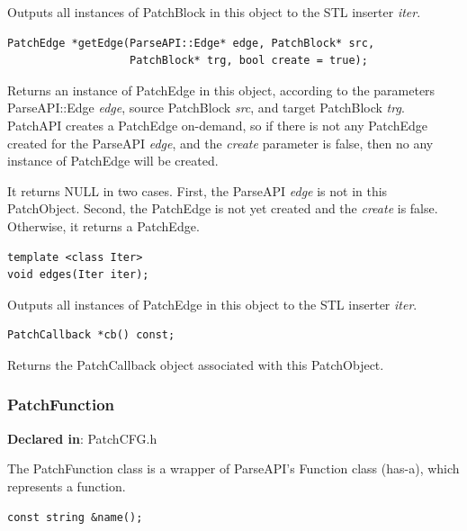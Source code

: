 \documentclass[11pt]{article}
\begin{document}
Outputs all instances of PatchBlock in this object to the STL inserter \emph{iter}.


\begin{verbatim}
PatchEdge *getEdge(ParseAPI::Edge* edge, PatchBlock* src,
                   PatchBlock* trg, bool create = true);

\end{verbatim}



Returns an instance of PatchEdge in this object, according to the parameters
ParseAPI::Edge \emph{edge}, source PatchBlock \emph{src}, and target PatchBlock
\emph{trg}. PatchAPI creates a PatchEdge on-demand, so if there is not any PatchEdge
created for the ParseAPI \emph{edge}, and the \emph{create} parameter is false, then no
any instance of PatchEdge will be created.

It returns NULL in two cases. First, the ParseAPI \emph{edge} is not in this
PatchObject. Second, the PatchEdge is not yet created and the \emph{create} is
false. Otherwise, it returns a PatchEdge.


\begin{verbatim}
template <class Iter>
void edges(Iter iter);

\end{verbatim}



Outputs all instances of PatchEdge in this object to the STL inserter \emph{iter}.


\begin{verbatim}
PatchCallback *cb() const;

\end{verbatim}



Returns the PatchCallback object associated with this PatchObject.

\subsubsection{PatchFunction}
\label{sec-3.2.9}

\textbf{Declared in}: PatchCFG.h

The PatchFunction class is a wrapper of ParseAPI's Function class (has-a), which
represents a function.


\begin{verbatim}
const string &name();

\end{verbatim}
\end{document}
